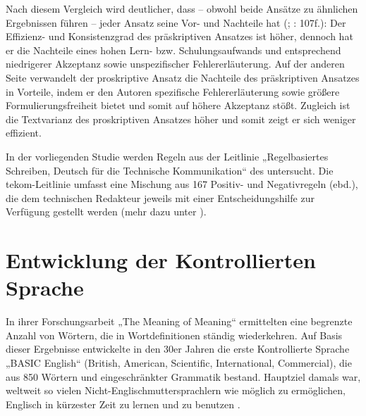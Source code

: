 Nach diesem Vergleich wird deutlicher, dass -- obwohl beide Ansätze zu ähnlichen Ergebnissen führen -- jeder Ansatz seine Vor- und Nachteile hat (\citealt{Reuther2007}; \citealt{LehrndorferReuther2008}: 107f.): Der Effizienz- und Konsistenzgrad des präskriptiven Ansatzes ist höher, dennoch hat er die Nachteile eines hohen Lern- bzw. Schulungsaufwands und entsprechend niedrigerer Akzeptanz sowie unspezifischer Fehlererläuterung. Auf der anderen Seite verwandelt der proskriptive Ansatz die Nachteile des präskriptiven Ansatzes in Vorteile, indem er den Autoren spezifische Fehlererläuterung sowie größere Formulierungsfreiheit bietet und somit auf höhere Akzeptanz stößt. Zugleich ist die Textvarianz des proskriptiven Ansatzes höher und somit zeigt er sich weniger effizient.

In der vorliegenden Studie werden Regeln aus der Leitlinie „Regelbasiertes Schreiben, Deutsch für die Technische Kommunikation“ des \citet{tekom2013} untersucht. Die tekom-Leitlinie umfasst eine Mischung aus 167 Positiv- und Negativregeln (ebd.), die dem technischen Redakteur jeweils mit einer Entscheidungshilfe zur Verfügung gestellt werden (mehr dazu unter ).

\section{\label{sec:2.2}Entwicklung der Kontrollierten Sprache}

In ihrer Forschungsarbeit „The Meaning of Meaning“ ermittelten \citet{RichardsOgden1989} eine begrenzte Anzahl von Wörtern, die in Wortdefinitionen ständig wiederkehren. Auf Basis dieser Ergebnisse entwickelte \citet{Ogden1935} in den 30er Jahren die erste Kontrollierte Sprache „BASIC English“ (British, American, Scientific, International, Commercial), die aus 850 Wörtern und eingeschränkter Grammatik bestand. Hauptziel damals war, weltweit so vielen Nicht-Eng\-lisch\-mut\-ter\-sprach\-lern wie möglich zu ermöglichen, Englisch in kürzester Zeit zu lernen und zu benutzen \citep{Schwitter2007}.

